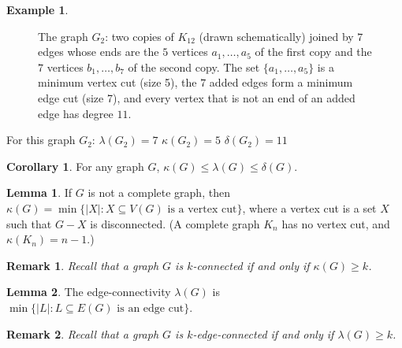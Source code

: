 \documentclass{article}
\newtheorem{remark}{Remark}
\theoremstyle{definition}
\newtheorem{example}{Example}
\newtheorem{lemma}{Lemma}
\newtheorem{corollary}{Corollary}
\begin{document}
\begin{example}
\begin{figure}[h]
\caption{The graph $G_2$: two copies of $K_{12}$ (drawn schematically) joined by $7$ edges whose ends are the $5$ vertices $a_1, \ldots, a_5$ of the first copy and the $7$ vertices $b_1, \ldots, b_7$ of the second copy. The set $\{a_1, \ldots, a_5\}$ is a minimum vertex cut (size 5), the $7$ added edges form a minimum edge cut (size 7), and every vertex that is not an end of an added edge has degree $11$.}
\label{fig:two-k12-copies}
\end{figure}

For this graph $G_2$:
$\lambda(G_2) = 7$
$\kappa(G_2) = 5$
$\delta(G_2) = 11$
\end{example}

\begin{corollary}
For any graph $G$,
$\kappa(G) \leq \lambda(G) \leq \delta(G)$.
\end{corollary}

\begin{lemma}
If $G$ is not a complete graph, then $\kappa(G) = \min\{|X| : X \subseteq V(G) \text{ is a vertex cut}\}$, where a vertex cut is a set $X$ such that $G - X$ is disconnected. (A complete graph $K_n$ has no vertex cut, and $\kappa(K_n) = n-1$.)
\end{lemma}

\begin{remark}
Recall that a graph $G$ is $k$-connected if and only if
$\kappa(G) \geq k$.
\end{remark}

\begin{lemma}
The edge-connectivity $\lambda(G)$ is
$\min\{|L| : L \subseteq E(G) \text{ is an edge cut}\}$.
\end{lemma}

\begin{remark}
Recall that a graph $G$ is $k$-edge-connected if and only if
$\lambda(G) \geq k$.
\end{remark}
\end{document}
